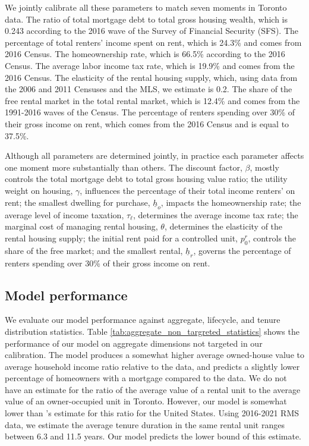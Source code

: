 \documentclass[parskip=full]{article}
\begin{document}
We jointly calibrate all these parameters to match seven moments in Toronto data. The ratio of total mortgage debt to total gross housing wealth, which is 0.243 according to the 2016 wave of the Survey of Financial Security (SFS). The percentage of total renters' income spent on rent, which is 24.3\% and comes from 2016 Census. The homeownership rate, which is 66.5\% according to the 2016 Census. The average labor income tax rate, which is 19.9\% and comes from the 2016 Census. The elasticity of the rental housing supply, which, using data from the 2006 and 2011 Censuses and the MLS, we estimate is 0.2. The share of the free rental market in the total rental market, which is 12.4\% and comes from the 1991-2016 waves of the Census. The percentage of renters spending over 30\% of their gross income on rent, which comes from the 2016 Census and is equal to 37.5\%.

Although all parameters are determined jointly, in practice each parameter affects one moment more substantially than others. The discount factor, $\beta$, mostly controls the total mortgage debt to total gross housing value ratio; the utility weight on housing, $\gamma$, influences the percentage of their total income renters' on rent; the smallest dwelling for purchase, $\underline{h}_{o}$, impacts the homeownership rate; the average level of income taxation, $\tau_{\ell}$, determines the average income tax rate; the marginal cost of managing rental housing, $\theta$, determines the elasticity of the rental housing supply; the initial rent paid for a controlled unit, $p^{r}_{0}$, controls the share of the free market; and the smallest rental, $\underline{h}_{r}$, governs the percentage of renters spending over 30\% of their gross income on rent.

\subsection{Model performance}\label{subsection:non_targeted_statistics}

We evaluate our model performance against aggregate, lifecycle, and tenure distribution statistics. Table \ref{tab:aggregate_non_targreted_statistics} shows the performance of our model on aggregate dimensions not targeted in our calibration. The model produces a somewhat higher average owned-house value to average household income ratio relative to the data, and predicts a slightly lower percentage of homeowners with a mortgage compared to the data. We do not have an estimate for the ratio of the average value of a rental unit to the average value of an owner-occupied unit in Toronto. However, our model is somewhat lower than \citet{chatterjee-eyigungor-2015}'s estimate for this ratio for the United States. Using 2016-2021 RMS data, we estimate the average tenure duration in the same rental unit ranges between 6.3 and 11.5 years. Our model predicts the lower bound of this estimate. 
\end{document}
